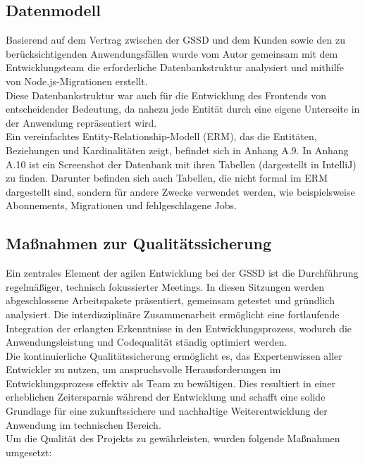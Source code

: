 \begin{flushleft}
\subsection{Datenmodell}
Basierend auf dem Vertrag zwischen der \acs{GSSD} und dem Kunden sowie den zu berücksichtigenden Anwendungsfällen wurde vom Autor gemeinsam mit dem Entwicklungsteam die erforderliche Datenbankstruktur analysiert und mithilfe von Node.js-Migrationen erstellt.
\\
Diese Datenbankstruktur war auch für die Entwicklung des Frontends von entscheidender Bedeutung, da nahezu jede Entität durch eine eigene Unterseite in der Anwendung repräsentiert wird.
\\
Ein vereinfachtes Entity-Relationship-Modell (ERM), das die Entitäten, Beziehungen und Kardinalitäten zeigt, befindet sich in Anhang A.9. In Anhang A.10 ist ein Screenshot der Datenbank mit ihren Tabellen (dargestellt in IntelliJ) zu finden. Darunter befinden sich auch Tabellen, die nicht formal im ERM dargestellt sind, sondern für andere Zwecke verwendet werden, wie beispielsweise Abonnements, Migrationen und fehlgeschlagene Jobs.





\subsection{Maßnahmen zur Qualitätssicherung}

Ein zentrales Element der agilen Entwicklung bei der \acs{GSSD} ist die Durchführung regelmäßiger, technisch fokussierter Meetings. In diesen Sitzungen werden abgeschlossene Arbeitspakete präsentiert, gemeinsam getestet und gründlich analysiert. Die interdisziplinäre Zusammenarbeit ermöglicht eine fortlaufende Integration der erlangten Erkenntnisse in den Entwicklungsprozess, wodurch die Anwendungsleistung und Codequalität ständig optimiert werden.
\\
Die kontinuierliche Qualitätssicherung ermöglicht es, das Expertenwissen aller Entwickler zu nutzen, um anspruchsvolle Herausforderungen im Entwicklungsprozess effektiv als Team zu bewältigen. Dies resultiert in einer erheblichen Zeitersparnis während der Entwicklung und schafft eine solide Grundlage für eine zukunftssichere und nachhaltige Weiterentwicklung der Anwendung im technischen Bereich.
\\
Um die Qualität des Projekts zu gewährleisten, wurden folgende Maßnahmen umgesetzt:


\end{flushleft}
